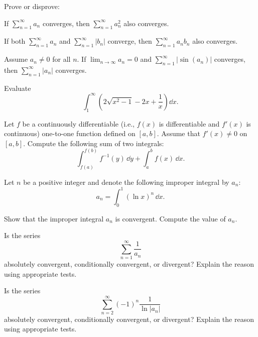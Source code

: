 \begin{problem}
Prove or disprove:
\begin{problemchoices}
\item If $\displaystyle\sum_{n=1}^{\infty}a_n$ converges, then $\displaystyle\sum_{n=1}^{\infty}a_n^2$ also converges.
\item If both $\displaystyle\sum_{n=1}^{\infty}a_n$ and $\displaystyle\sum_{n=1}^{\infty}|b_n|$ converge, then $\displaystyle\sum_{n=1}^{\infty}a_nb_n$ also converges.
\item Assume $a_n\ne0$ for all $n$. If $\displaystyle\lim_{n\to\infty}a_n=0$ and $\displaystyle\sum_{n=1}^{\infty}|\sin(a_n)|$ converges, then $\displaystyle\sum_{n=1}^{\infty}|a_n|$ converges.
\end{problemchoices}
\end{problem}

\begin{problem}
Evaluate
\[
\int_1^\infty\left(2\sqrt{x^2-1}-2x+\frac1x\right)\dd x.
\]
\end{problem}

\begin{problem}
Let $f$ be a continuously differentiable (i.e., $f(x)$ is differentiable and $f'(x)$ is continuous) one-to-one function defined on $[a, b]$. Assume that $f'(x)\ne0$ on $[a, b]$. Compute the following sum of two integrals:
\[
\int_{f(a)}^{f(b)}f^{-1}(y)\,\dd y+\int_a^b f(x)\,\dd x.
\]
\end{problem}

\begin{problem}
Let $n$ be a positive integer and denote the following improper integral by $a_n$:
\[
a_n=\int_0^1(\ln x)^n\,\dd x.
\]
\begin{problemsubparts}
\item Show that the improper integral $a_n$ is convergent. Compute the value of $a_n$.
\item Is the series
\[
\sum_{n=1}^{\infty}\frac1{a_n}
\]
absolutely convergent, conditionally convergent, or divergent? Explain the reason using appropriate tests.
\item Is the series
\[
\sum_{n=2}^{\infty}(-1)^n\frac1{\ln|a_n|}
\]
absolutely convergent, conditionally convergent, or divergent? Explain the reason using appropriate tests.
\end{problemsubparts}
\end{problem}

